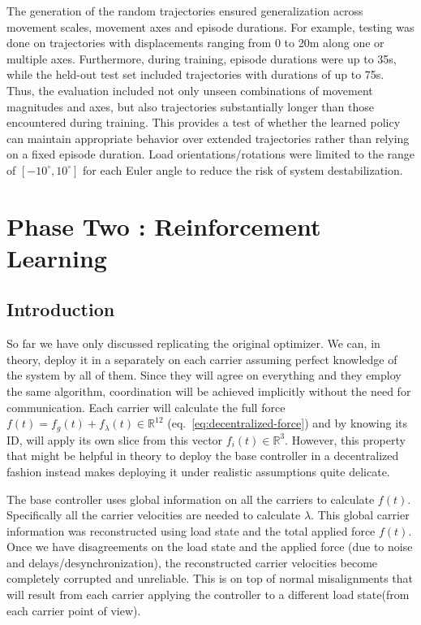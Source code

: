The generation of the random trajectories ensured generalization across
movement scales, movement axes and episode durations. For example,
testing was done on trajectories with displacements ranging from 0 to
20m along one or multiple axes. Furthermore, during training, episode
durations were up to 35s, while the held-out test set included
trajectories with durations of up to 75s. Thus, the evaluation included
not only unseen combinations of movement magnitudes and axes, but also
trajectories substantially longer than those encountered during
training. This provides a test of whether the learned policy can
maintain appropriate behavior over extended trajectories rather than
relying on a fixed episode duration. Load orientations/rotations were limited
to the range
of $[-10^\circ, 10^\circ]$ for each Euler angle to reduce the risk of
system destabilization.

\section{Phase Two : Reinforcement Learning}

\subsection{Introduction}

So far we have only discussed replicating the original optimizer. We can, 
in theory, deploy it in a separately on each carrier
assuming perfect knowledge of the system by all of them. Since they
will agree on everything and they employ the same algorithm,
coordination will be achieved implicitly without the need for
communication. Each carrier will calculate the full force $f(t) = f_g(t)
+ f_\lambda(t) \in \mathbb{R}^{12}$ (eq.~\eqref{eq:decentralized-force})
and by knowing its ID, will apply its own slice from this vector $f_i(t)
\in \mathbb{R}^3$. However, this property that might be helpful in
theory to deploy the base controller in a decentralized fashion instead makes
deploying it under realistic assumptions quite delicate. 

The base 
controller uses global information on all the carriers to calculate
$f(t)$. Specifically all the carrier velocities are needed to calculate
$\lambda$. This global carrier information was reconstructed using load
state and the total applied force $f(t)$. Once we have disagreements on
the load state and the applied force (due to noise and
delays/desynchronization), the reconstructed carrier velocities become
completely corrupted and unreliable. This is on top of normal
misalignments that will result from each carrier applying the
controller to a different load state(from each carrier point of view). 

